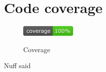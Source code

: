 \section{Code coverage}
\begin{figure}[H]
    \centering
    \caption{Coverage}
    \includegraphics{ImplementationAndTest/Diagrams/jacoco.png}
    \label{fig:coverage}
\end{figure}
Nuff said